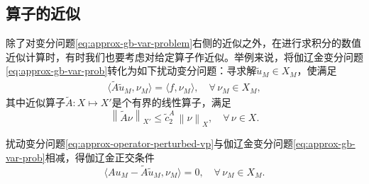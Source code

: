 \subsection{算子的近似}
\label{sec:approx-operator}

除了对变分问题\eqref{eq:approx-gb-var-problem}右侧的近似之外，在进行求积分的数值近似计算时，有时我们也要考虑对给定算子作近似。举例来说，将伽辽金变分问题\eqref{eq:approx-gb-var-prob}转化为如下扰动变分问题：寻求解$\tilde{u}_{M} \in X_{M}$，使满足
\begin{equation}
  \label{eq:approx-operator-perturbed-vp}
  \begin{split}
    \langle \widetilde{A} \tilde{u}_{M}, \nu_{M} \rangle = \langle f, \nu_{M} \rangle, \quad \forall \, \nu_{M} \in X_{M},
  \end{split}
\end{equation}
其中近似算子$\widetilde{A}:X \mapsto X'$是个有界的线性算子，满足
\begin{equation}
  \label{eq:approx-operator-tildea}
  \left\| \widetilde{A} \nu \right\|_{X'} \le \tilde{c}_{2}^{A} \, \left\| \nu \right\|_{X}, \quad \forall \, \nu \in X.
\end{equation}

扰动变分问题\eqref{eq:approx-operator-perturbed-vp}与伽辽金变分问题\eqref{eq:approx-gb-var-prob}相减，得伽辽金正交条件
\begin{equation}
  \label{eq:approx-operator-orthogonality}
  \langle A u_{M} - \widetilde{A} \tilde{u}_{M}, \nu_{M} \rangle = 0, \quad \forall \, \nu_{M} \in X_{M}.
\end{equation}

